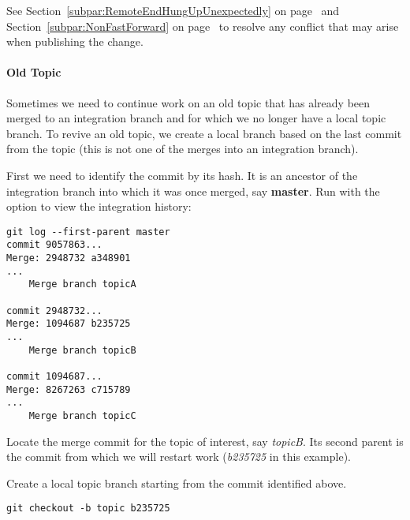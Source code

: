 See Section~\ref{subpar:RemoteEndHungUpUnexpectedly} on
page~\pageref{subpar:RemoteEndHungUpUnexpectedly} and
Section~\ref{subpar:NonFastForward} on page~\pageref{subpar:NonFastForward} to
resolve any conflict that may arise when publishing the change.


\paragraph{Old Topic}
\label{par:OldTopic}

Sometimes we need to continue work on an old topic that has already been merged
to an integration branch and for which we no longer have a local topic branch.
To revive an old topic, we create a local branch based on the last commit from
the topic (this is not one of the merges into an integration branch).

First we need to identify the commit by its hash. It is an ancestor of the
integration branch into which it was once merged, say \textbf{master}. Run
 with the  option to view the integration
history:

\begin{verbatim}
git log --first-parent master
commit 9057863...
Merge: 2948732 a348901
...
    Merge branch topicA

commit 2948732...
Merge: 1094687 b235725
...
    Merge branch topicB

commit 1094687...
Merge: 8267263 c715789
...
    Merge branch topicC
\end{verbatim}

Locate the merge commit for the topic of interest, say \textit{topicB}. Its
second parent is the commit from which we will restart work (\textit{b235725} in
this example).

Create a local topic branch starting from the commit identified above.

\begin{verbatim}
git checkout -b topic b235725
\end{verbatim}

\begin{figure}
\centering
{}
\label{fig:CreateLocalBranchFromCommitAndSwitchToIt}
\end{figure}

